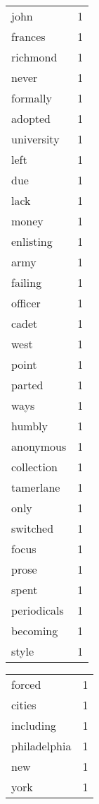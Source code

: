 \begin{center}
\begin{scriptsize}
\begin{tabular}{|ll|}
john          & 1\\%
frances       & 1\\%
richmond      & 1\\%
never         & 1\\%
formally      & 1\\%
adopted       & 1\\%
university    & 1\\%
left          & 1\\%
due           & 1\\%
lack          & 1\\%
money         & 1\\%
enlisting     & 1\\%
army          & 1\\%
failing       & 1\\%
officer       & 1\\%
cadet         & 1\\%
west          & 1\\%
point         & 1\\%
parted        & 1\\%
ways          & 1\\%
humbly        & 1\\%
anonymous     & 1\\%
collection    & 1\\%
tamerlane     & 1\\%
only          & 1\\%
switched      & 1\\%
focus         & 1\\%
prose         & 1\\%
spent         & 1\\%
periodicals   & 1\\%
becoming      & 1\\%
style         & 1\\%
\hline
\end{tabular}
\begin{tabular}{|ll|}
\hline
forced        & 1\\%
cities        & 1\\%
including     & 1\\%
philadelphia  & 1\\%
new           & 1\\%
york          & 1\\%

\end{tabular}
\end{scriptsize}
\end{center}

